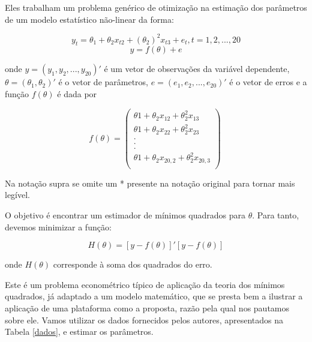 \documentclass{abnt}
\begin{document}
Eles trabalham um problema genérico de otimização na estimação dos parâmetros de um modelo  estatístico não-linear da forma:

\[ y_t = \theta_1 + \theta_2 x_{t2} + (\theta_2)^2 x_{t3} +e_t , t = 1,2,...,20 \]
\[ y = f(\theta)+e\]


	onde $y = (y_1, y_2, ..., y_{20})'$ é um vetor de observações da variável dependente, $\theta = (\theta_1, \theta_2)'$ é o vetor de parâmetros, $e = (e_1, e_2, ..., e_{20})'$ é o vetor de erros e a função $f(\theta)$ é dada por 

\[ f(\theta)=
        \left( \begin{array}{ccc}
\theta1 + \theta_2 x_{12} + \theta_2^2 x_{13} \\
\theta1 + \theta_2 x_{22} + \theta_2^2 x_{23} \\
.\\
.\\
.\\
\theta1 + \theta_2 x_{20,2} + \theta_2^2 x_{20,3} \\

\end{array} \right)\
 \]

Na notação supra se omite um * presente na notação original para tornar mais legível.
 
 O objetivo é encontrar um estimador de mínimos quadrados para $\theta$. Para tanto, devemos minimizar a função:
 
\begin{equation}
  \label{eq_H}
  H(\theta) = [y - f(\theta)]'[y - f(\theta)] 
\end{equation}

onde $H(\theta)$ corresponde à soma dos quadrados do erro.


	Este é um problema econométrico típico de aplicação da teoria dos mínimos quadrados, já adaptado a um modelo matemático, que se presta bem a ilustrar a aplicação de uma plataforma como a proposta, razão pela qual nos pautamos sobre ele. Vamos utilizar os dados fornecidos pelos autores, apresentados na Tabela \ref{dados}, e estimar os parâmetros.
\end{document}
